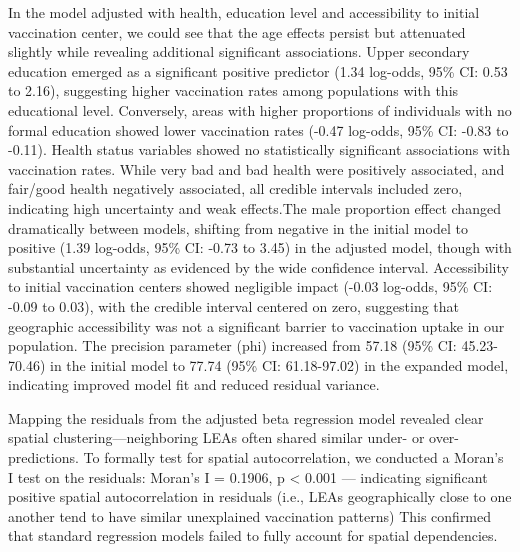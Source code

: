 \documentclass{article}
\begin{document}
In the model adjusted with health, education level and accessibility to
initial vaccination center, we could see that the age effects persist
but attenuated slightly while revealing additional significant
associations. Upper secondary education emerged as a significant
positive predictor (1.34 log-odds, 95\% CI: 0.53 to 2.16), suggesting
higher vaccination rates among populations with this educational level.
Conversely, areas with higher proportions of individuals with no formal
education showed lower vaccination rates (-0.47 log-odds, 95\% CI: -0.83
to -0.11). Health status variables showed no statistically significant
associations with vaccination rates. While very bad and bad health were
positively associated, and fair/good health negatively associated, all
credible intervals included zero, indicating high uncertainty and weak
effects.The male proportion effect changed dramatically between models,
shifting from negative in the initial model to positive (1.39 log-odds,
95\% CI: -0.73 to 3.45) in the adjusted model, though with substantial
uncertainty as evidenced by the wide confidence interval. Accessibility
to initial vaccination centers showed negligible impact (-0.03 log-odds,
95\% CI: -0.09 to 0.03), with the credible interval centered on zero,
suggesting that geographic accessibility was not a significant barrier
to vaccination uptake in our population. The precision parameter (phi)
increased from 57.18 (95\% CI: 45.23-70.46) in the initial model to
77.74 (95\% CI: 61.18-97.02) in the expanded model, indicating improved
model fit and reduced residual variance.

Mapping the residuals from the adjusted beta regression model revealed
clear spatial clustering---neighboring LEAs often shared similar under-
or over-predictions. To formally test for spatial autocorrelation, we
conducted a Moran's I test on the residuals: Moran's I = 0.1906, p
\textless{} 0.001 --- indicating significant positive spatial
autocorrelation in residuals (i.e., LEAs geographically close to one
another tend to have similar unexplained vaccination patterns) This
confirmed that standard regression models failed to fully account for
spatial dependencies.
\end{document}
